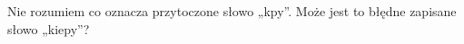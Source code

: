 \documentclass[a4paper,11pt]{article}
\begin{document}
\VerSpaceFour





\noindent
{} Nie rozumiem co oznacza przytoczone słowo „kpy”. Może
jest to błędne zapisane słowo „kiepy”?

\VerSpaceFour











\newpage

\end{document}
